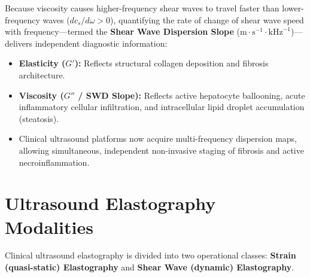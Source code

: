 \documentclass[11pt,a4paper]{article}
\begin{document}
\begin{physicsbox}
Because viscosity causes higher-frequency shear waves to travel faster than lower-frequency waves ($d c_s / d\omega > 0$), quantifying the rate of change of shear wave speed with frequency---termed the \textbf{Shear Wave Dispersion Slope} ($\text{m}\cdot\text{s}^{-1}\cdot\text{kHz}^{-1}$)---delivers independent diagnostic information:
\begin{itemize}
    \item \textbf{Elasticity ($G'$):} Reflects structural collagen deposition and fibrosis architecture.
    \item \textbf{Viscosity ($G''$ / SWD Slope):} Reflects active hepatocyte ballooning, acute inflammatory cellular infiltration, and intracellular lipid droplet accumulation (steatosis).
    \item Clinical ultrasound platforms now acquire multi-frequency dispersion maps, allowing simultaneous, independent non-invasive staging of fibrosis and active necroinflammation.
\end{itemize}
\end{physicsbox}

\section{Ultrasound Elastography Modalities}
Clinical ultrasound elastography is divided into two operational classes: \textbf{Strain (quasi-static) Elastography} and \textbf{Shear Wave (dynamic) Elastography}.
\end{document}
